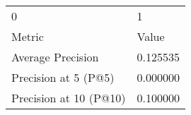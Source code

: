 \begin{tabular}{ll}
0 & 1 \\
Metric & Value \\
Average Precision & 0.125535 \\
Precision at 5 (P@5) & 0.000000 \\
Precision at 10 (P@10) & 0.100000 \\
\end{tabular}
